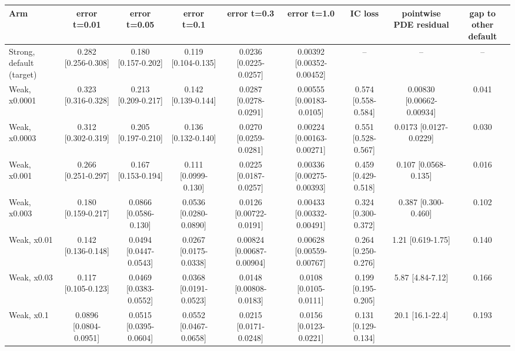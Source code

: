 \begin{tabular}{lcccccccc}
\toprule
Arm & error t=0.01 & error t=0.05 & error t=0.1 & error t=0.3 & error t=1.0 & IC loss & pointwise PDE residual & gap to other default \\
\midrule
Strong, default (target) & 0.282 {\scriptsize[0.256-0.308]} & 0.180 {\scriptsize[0.157-0.202]} & 0.119 {\scriptsize[0.104-0.135]} & 0.0236 {\scriptsize[0.0225-0.0257]} & 0.00392 {\scriptsize[0.00352-0.00452]} & -- & -- & -- \\
Weak, x0.0001 & 0.323 {\scriptsize[0.316-0.328]} & 0.213 {\scriptsize[0.209-0.217]} & 0.142 {\scriptsize[0.139-0.144]} & 0.0287 {\scriptsize[0.0278-0.0291]} & 0.00555 {\scriptsize[0.00183-0.0105]} & 0.574 {\scriptsize[0.558-0.584]} & 0.00830 {\scriptsize[0.00662-0.00934]} & 0.041 \\
Weak, x0.0003 & 0.312 {\scriptsize[0.302-0.319]} & 0.205 {\scriptsize[0.197-0.210]} & 0.136 {\scriptsize[0.132-0.140]} & 0.0270 {\scriptsize[0.0259-0.0281]} & 0.00224 {\scriptsize[0.00163-0.00271]} & 0.551 {\scriptsize[0.528-0.567]} & 0.0173 {\scriptsize[0.0127-0.0229]} & 0.030 \\
Weak, x0.001 & 0.266 {\scriptsize[0.251-0.297]} & 0.167 {\scriptsize[0.153-0.194]} & 0.111 {\scriptsize[0.0999-0.130]} & 0.0225 {\scriptsize[0.0187-0.0257]} & 0.00336 {\scriptsize[0.00275-0.00393]} & 0.459 {\scriptsize[0.429-0.518]} & 0.107 {\scriptsize[0.0568-0.135]} & 0.016 \\
Weak, x0.003 & 0.180 {\scriptsize[0.159-0.217]} & 0.0866 {\scriptsize[0.0586-0.130]} & 0.0536 {\scriptsize[0.0280-0.0890]} & 0.0126 {\scriptsize[0.00722-0.0191]} & 0.00433 {\scriptsize[0.00332-0.00491]} & 0.324 {\scriptsize[0.300-0.372]} & 0.387 {\scriptsize[0.300-0.460]} & 0.102 \\
Weak, x0.01 & 0.142 {\scriptsize[0.136-0.148]} & 0.0494 {\scriptsize[0.0447-0.0543]} & 0.0267 {\scriptsize[0.0175-0.0338]} & 0.00824 {\scriptsize[0.00687-0.00904]} & 0.00628 {\scriptsize[0.00559-0.00767]} & 0.264 {\scriptsize[0.250-0.276]} & 1.21 {\scriptsize[0.619-1.75]} & 0.140 \\
Weak, x0.03 & 0.117 {\scriptsize[0.105-0.123]} & 0.0469 {\scriptsize[0.0383-0.0552]} & 0.0368 {\scriptsize[0.0191-0.0523]} & 0.0148 {\scriptsize[0.00808-0.0183]} & 0.0108 {\scriptsize[0.0105-0.0111]} & 0.199 {\scriptsize[0.195-0.205]} & 5.87 {\scriptsize[4.84-7.12]} & 0.166 \\
Weak, x0.1 & 0.0896 {\scriptsize[0.0804-0.0951]} & 0.0515 {\scriptsize[0.0395-0.0604]} & 0.0552 {\scriptsize[0.0467-0.0658]} & 0.0215 {\scriptsize[0.0171-0.0248]} & 0.0156 {\scriptsize[0.0123-0.0221]} & 0.131 {\scriptsize[0.129-0.134]} & 20.1 {\scriptsize[16.1-22.4]} & 0.193 \\

\end{tabular}
